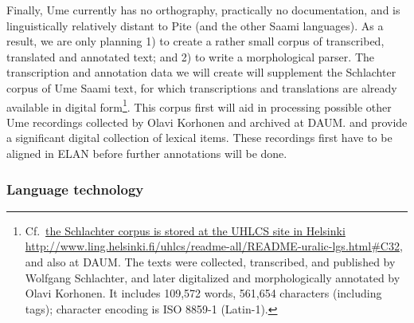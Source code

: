 \documentclass[a4paper,12pt]{article}
\begin{document}
Finally, Ume currently has no orthography, practically no documentation, and is linguistically relatively distant to Pite (and the other Saami languages). As a result, we are only planning 1) to create a rather small corpus of transcribed, translated and annotated text; and 2) to write a morphological parser. The transcription and annotation data we will create will supplement the Schlachter corpus of Ume Saami text, for which transcriptions and translations are already available in digital form\footnote{Cf.~\url{the Schlachter corpus is stored at the UHLCS site in Helsinki http://www.ling.helsinki.fi/uhlcs/readme-all/README-uralic-lgs.html#C32}, 
and also at DAUM. %
The texts were collected, transcribed, and published by Wolfgang Schlachter, and later digitalized and morphologically annotated by Olavi Korhonen. It includes 109,572 words, 561,654 characters (including tags); character encoding is ISO 8859-1 (Latin-1).}. This corpus first will aid in processing 
possible %
other Ume recordings collected by Olavi Korhonen and archived at DAUM. 
 and provide a significant digital collection of lexical items. These recordings first have to be aligned in ELAN before 
further annotations will be done. %

\subsubsection{Language technology}
\end{document}
